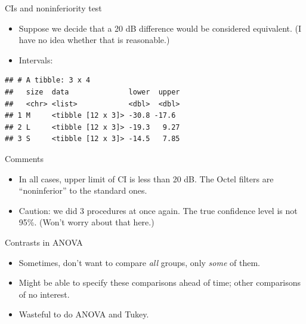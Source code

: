 \documentclass[
  ignorenonframetext,
]{beamer}
\newenvironment{Shaded}{\begin{snugshade}}{\end{snugshade}}
\newcommand{\DataTypeTok}[1]{\textcolor[rgb]{0.13,0.29,0.53}{#1}}
\newcommand{\KeywordTok}[1]{\textcolor[rgb]{0.13,0.29,0.53}{\textbf{#1}}}
\newcommand{\NormalTok}[1]{#1}
\newcommand{\OperatorTok}[1]{\textcolor[rgb]{0.81,0.36,0.00}{\textbf{#1}}}
\newcommand{\StringTok}[1]{\textcolor[rgb]{0.31,0.60,0.02}{#1}}
\begin{document}
\begin{frame}[fragile]{CIs and noninferiority test}
\protect\hypertarget{cis-and-noninferiority-test}{}

\begin{itemize}
\item
  Suppose we decide that a 20 dB difference would be considered
  equivalent. (I have no idea whether that is reasonable.)
\item
  Intervals: \vspace{2ex}
\end{itemize}

\small

\begin{Shaded}
\end{Shaded}

\begin{verbatim}
## # A tibble: 3 x 4
##   size  data              lower  upper
##   <chr> <list>            <dbl>  <dbl>
## 1 M     <tibble [12 x 3]> -30.8 -17.6 
## 2 L     <tibble [12 x 3]> -19.3   9.27
## 3 S     <tibble [12 x 3]> -14.5   7.85
\end{verbatim}

\normalsize

\end{frame}

\begin{frame}{Comments}
\protect\hypertarget{comments-19}{}

\begin{itemize}
\item
  In all cases, upper limit of CI is less than 20 dB. The Octel filters
  are ``noninferior'' to the standard ones.
\item
  Caution: we did 3 procedures at once again. The true confidence level
  is not 95\%. (Won't worry about that here.)
\end{itemize}

\end{frame}

\begin{frame}{Contrasts in ANOVA}
\protect\hypertarget{contrasts-in-anova}{}

\begin{itemize}
\item
  Sometimes, don't want to compare \emph{all} groups, only \emph{some}
  of them.
\item
  Might be able to specify these comparisons ahead of time; other
  comparisons of no interest.
\item
  Wasteful to do ANOVA and Tukey.
\end{itemize}

\end{frame}
\end{document}
